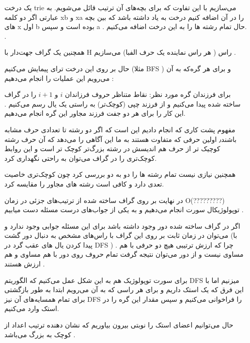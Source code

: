 
%	


یک درخت 
trie 
می‌سازیم با این تفاوت
که برای بچه‌های آن ترتیب 
قائل می‌شویم.
به عبارتی
اگر دو کلمه 
xb 
و 
xa 
را در آن اضافه کنیم درخت به یاد 
داشته باشد که بین بچه های 
x 
اول 
b 
بوده است و سپس 
a
.
حال تمام رشته ها را به این درخت اضافه می‌کنیم.
.

همچنین یک گراف جهت‌دار با H راس 
( هر راس نماینده یک حرف الفبا) 
می‌سازیم
.

حال بر روی این درخت ترای پیمایش می‌کنیم
(مثلا 
BFS
)
و برای هر گره‌که به آن می‌رویم این عملیات را انجام می‌دهیم
:

برای فرزندان گره مورد نظر:
نقاط متناظر حروف فرزاندان 
$i$ 
و
$i+1$
را در گراف ساخته شده پیدا می‌کنیم 
و
از فرزند چپی (کوچک‌تر) به راستی یک یال رسم می‌کنیم
.
این کار را برای هر دو جفت فرزند مجاور این گره انجام می‌دهیم.

مفهوم
 پشت کاری که انجام دادیم این است که اگر دو
 رشته تا تعدادی حرف مشابه باشند٫ 
 اولین حرفی که متفاوت هستند 
 به ما این آگاهی را می‌دهد 
 که آن حرف رشته کوچیک تر از حرف هم اندیسش در رشته بزرگ‌تر کوچک تر است
 و
  این روابط کوچک‌تری را در گراف می‌توان به راحتی نگهداری کرد.

همچنین نیازی نیست تمام رشته ها را دو به دو بررسی کرد چون کوچک‌تری خاصیت تعدی دارد و کافی است رشته های مجاور را مقایسه کرد.

  در نهایت بر روی گراف ساخته شده از ترتیب‌های جزئی در زمان 
O(?????????)
   توپولوژیکال سورت انجام می‌دهیم 
  و به یکی از جواب‌های درست مسئله دست میابیم
  .

  اگر در گراف ساخته شده دور وجود داشته باشد برای این مسئله جوابی وجود ندارد 
  و می‌توان در زمان ثابت 
  بر روی این گراف با راس‌های مشخص به دنبال دور گشت
  (با پیدا کردن یال های عقب گرد در 
  DFS
  ) .
  چرا که ارزش ترتیبی هیچ دو حرفی با هم مساوی نیست 
  و 
  از دور می‌توان نتیجه گرفت تمام حروف روی دور با هم مساوی و هم ارزش هستند
  .


  برای سورت توپولوژیک هم 
  به این شکل عمل می‌کنیم که الگوریتم 
  DFS 
  میزنیم اما با این فرق که 
  یک استک داریم و برای هر راسی 
  که به آن می‌رویم ابتدا 
  به طور بازگشتی برای تمام همسایه‌های آن 
  نیز  
  DFS
  را فراخوانی می‌کنیم 
  و
   سپس مقدار این گره را
   در استک وارد می‌کنیم.

   حال می‌توانیم اعضای استک را نوبتی بیرون بیاوریم
   که نشان دهنده ترتیب اعداد از کوچک به بزرگ می‌باشد
   .


